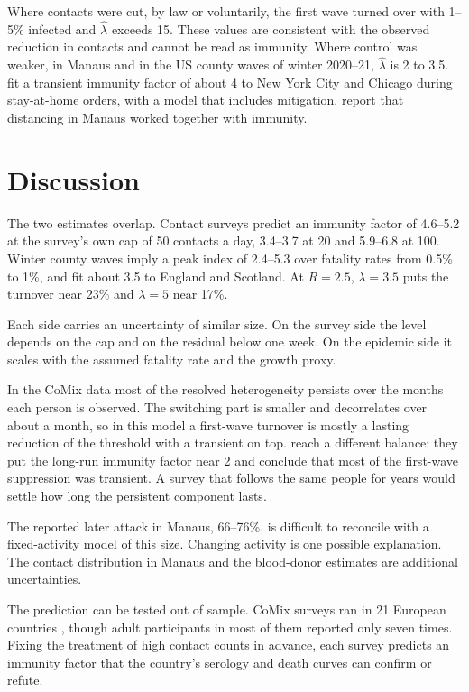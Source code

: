 \documentclass[11pt]{article}
\theoremstyle{remark}
\begin{document}
Where contacts were cut, by law or voluntarily, the first wave turned over with 1--5\% infected and $\hat\lambda$
exceeds 15. These values are consistent with the observed reduction in contacts and cannot be read as immunity. Where
control was weaker, in Manaus and in the US county waves of winter 2020--21, $\hat\lambda$ is 2 to 3.5.
\citet{tkachenko2021} fit a transient immunity factor of about 4 to New York City and Chicago during stay-at-home
orders, with a model that includes mitigation. \citet{buss2021} report that distancing in Manaus worked together with
immunity.

\section{Discussion}

The two estimates overlap. Contact surveys predict an immunity factor of 4.6--5.2 at the survey's own cap of 50
contacts a day, 3.4--3.7 at 20 and 5.9--6.8 at 100. Winter county waves imply a peak index of 2.4--5.3 over fatality
rates from 0.5\% to 1\%, and \citet{gomes2022} fit about 3.5 to England and Scotland. At $R = 2.5$, $\lambda = 3.5$
puts the turnover near 23\% and $\lambda = 5$ near 17\%.

Each side carries an uncertainty of similar size. On the survey side the level depends on the cap and on the residual
below one week. On the epidemic side it scales with the assumed fatality rate and the growth proxy.

In the CoMix data most of the resolved heterogeneity persists over the months each person is observed. The switching
part is smaller and decorrelates over about a month, so in this model a first-wave turnover is mostly a lasting
reduction of the threshold with a transient on top. \citet{tkachenko2021} reach a different balance: they put the
long-run immunity factor near 2 and conclude that most of the first-wave suppression was transient. A survey that
follows the same people for years would settle how long the persistent component lasts.

The reported later attack in Manaus, 66--76\%, is difficult to reconcile with a fixed-activity model of this size.
Changing activity is one possible explanation. The contact distribution in Manaus and the blood-donor estimates are
additional uncertainties.

The prediction can be tested out of sample. CoMix surveys ran in 21 European countries \citep{wong2023}, though adult
participants in most of them reported only seven times. Fixing the treatment of high contact counts in advance, each
survey predicts an immunity factor that the country's serology and death curves can confirm or refute.
\end{document}
